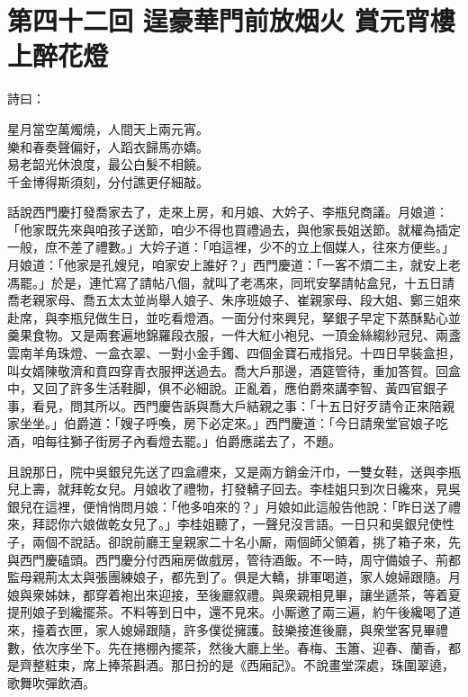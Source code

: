 
\chapter*{第四十二回 逞豪華門前放烟火 賞元宵樓上醉花燈}


詩曰：

\begin{myquote}
星月當空萬燭燒，人間天上兩元宵。\\樂和春奏聲偏好，人蹈衣歸馬亦嬌。\\易老韶光休浪度，最公白髮不相饒。\\千金博得斯須刻，分付譙更仔細敲。
\end{myquote}

話說西門慶打發喬家去了，走來上房，和月娘、大妗子、李瓶兒商議。月娘道：「他家既先來與咱孩子送節，咱少不得也買禮過去，與他家長姐送節。就權為插定一般，庶不差了禮數。」大妗子道：「咱這裡，少不的立上個媒人，往來方便些。」月娘道：「他家是孔嫂兒，咱家安上誰好？」西門慶道：「一客不煩二主，就安上老馮罷。」於是，連忙寫了請帖八個，就叫了老馮來，同玳安拏請帖盒兒，十五日請喬老親家母、喬五太太並尚舉人娘子、朱序班娘子、崔親家母、段大姐、鄭三姐來赴席，與李瓶兒做生日，並吃看燈酒。一面分付來興兒，拏銀子早定下蒸酥點心並羹果食物。又是兩套遍地錦羅段衣服，一件大紅小袍兒、一頂金絲縐紗冠兒、兩盞雲南羊角珠燈、一盒衣翠、一對小金手鐲、四個金寶石戒指兒。十四日早裝盒担，叫女婿陳敬濟和賁四穿青衣服押送過去。喬大戶那邊，酒筵管待，重加答賀。回盒中，又回了許多生活鞋脚，俱不必細說。正亂着，應伯爵來講李智、黃四官銀子事，看見，問其所以。西門慶告訴與喬大戶結親之事：「十五日好歹請令正來陪親家坐坐。」伯爵道：「嫂子呼喚，房下必定來。」西門慶道：「今日請衆堂官娘子吃酒，咱每往獅子街房子內看燈去罷。」伯爵應諾去了，不題。

且說那日，院中吳銀兒先送了四盒禮來，又是兩方銷金汗巾，一雙女鞋，送與李瓶兒上壽，就拜乾女兒。月娘收了禮物，打發轎子回去。李桂姐只到次日纔來，見吳銀兒在這裡，便悄悄問月娘：「他多咱來的？」月娘如此這般告他說：「昨日送了禮來，拜認你六娘做乾女兒了。」李桂姐聽了，一聲兒沒言語。一日只和吳銀兒使性子，兩個不說話。{}卻說前廳王皇親家二十名小厮，兩個師父領着，挑了箱子來，先與西門慶磕頭。西門慶分付西廂房做戲房，管待酒飯。不一時，周守備娘子、荊都監母親荊太太與張團練娘子，都先到了。俱是大轎，排軍喝道，家人媳婦跟隨。月娘與衆姊妹，都穿着袍出來迎接，至後廳叙禮。與衆親相見畢，讓坐遞茶，等着夏提刑娘子到纔擺茶。不料等到日中，還不見來。小厮邀了兩三遍，約午後纔喝了道來，擡着衣匣，家人媳婦跟隨，許多僕從擁護。鼓樂接進後廳，與衆堂客見畢禮數，依次序坐下。先在捲棚內擺茶，然後大廳上坐。春梅、玉簫、迎春、蘭香，都是齊整粧束，席上捧茶斟酒。那日扮的是《西廂記》。不說畫堂深處，珠圍翠遶，歌舞吹彈飲酒。


